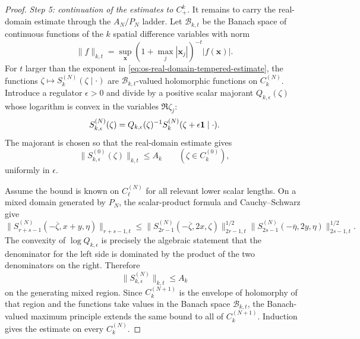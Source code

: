 \begin{proof}
\emph{Step 5: continuation of the estimates to \(C_+^k\).}
It remains to carry the real-domain estimate through the
\(A_N/P_N\) ladder.  Let \(\mathcal B_{k,t}\) be the Banach space of continuous
functions of the \(k\) spatial difference variables with norm
\[
  \|f\|_{k,t}
  =
  \sup_{\mathbf x}
  (1+\max_j|\mathbf x_j|)^{-t}|f(\mathbf x)|.
\]
For \(t\) larger than the exponent in
\eqref{eq:os-real-domain-tempered-estimate}, the functions
\(\zeta\mapsto S_k^{(N)}(\zeta\mid\cdot)\) are
\(\mathcal B_{k,t}\)-valued holomorphic functions on \(C_k^{(N)}\).  Introduce
a regulator \(\epsilon>0\) and divide by a positive scalar majorant
\(Q_{k,\epsilon}(\zeta)\) whose logarithm is convex in the variables
\(\Re\zeta_j\):
\[
  S_{k,\epsilon}^{(N)}(\zeta)
  =
  Q_{k,\epsilon}(\zeta)^{-1}
  S_k^{(N)}(\zeta+\epsilon{\bf 1}\mid\cdot).
\]
The majorant is chosen so that the real-domain estimate gives
\begin{equation}
  \|S_{k,\epsilon}^{(0)}(\zeta)\|_{k,t}\le A_k
  \qquad(\zeta\in C_k^{(0)}),
  \label{eq:os-renormalized-real-bound}
\end{equation}
uniformly in \(\epsilon\).

Assume the bound is known on \(C_\ell^{(N)}\) for all relevant lower scalar
lengths.  On a mixed domain generated by \(P_N\), the scalar-product formula
and Cauchy--Schwarz give
\begin{equation}
  \|S_{r+s-1}^{(N)}(-\overline\zeta,x+y,\eta)\|_{r+s-1,t}
  \le
  \|S_{2r-1}^{(N)}(-\overline\zeta,2x,\zeta)\|_{2r-1,t}^{1/2}
  \|S_{2s-1}^{(N)}(-\overline\eta,2y,\eta)\|_{2s-1,t}^{1/2}.
  \label{eq:os-banach-cauchy-schwarz}
\end{equation}
The convexity of \(\log Q_{k,\epsilon}\) is precisely the algebraic statement
that the denominator for the left side is dominated by the product of the two
denominators on the right.  Therefore
\[
  \|S_{k,\epsilon}^{(N)}\|_{k,t}\le A_k
\]
on the generating mixed region.  Since \(C_k^{(N+1)}\) is the envelope of
holomorphy of that region and the functions take values in the Banach space
\(\mathcal B_{k,t}\), the Banach-valued maximum principle extends the same
bound to all of \(C_k^{(N+1)}\).  Induction gives the estimate on every
\(C_k^{(N)}\).


\end{proof}
